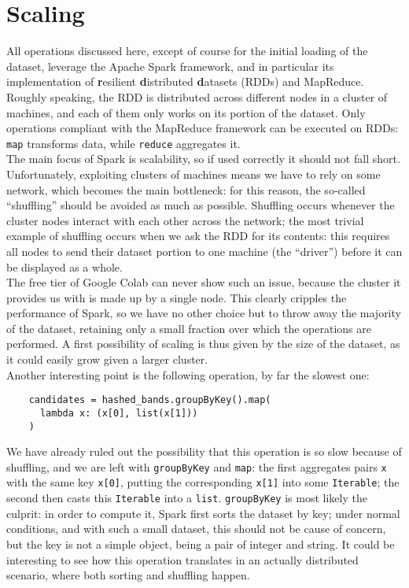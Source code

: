\documentclass{article}
\begin{document}
  \newpage

  \section{Scaling}
  All operations discussed here, except of course for the initial loading of
  the dataset, leverage the Apache Spark framework, and in particular its
  implementation of \textbf resilient \textbf distributed \textbf datasets
  (RDDs) and MapReduce. \\
  Roughly speaking, the RDD is distributed across different nodes in a cluster
  of machines, and each of them only works on its portion of the dataset. Only
  operations compliant with the MapReduce framework can be executed on RDDs:
  \texttt{map} transforms data, while \texttt{reduce} aggregates it. \\
  The main focus of Spark is scalability, so if used correctly it should not
  fall short. Unfortunately, exploiting clusters of machines means we have to
  rely on some network, which becomes the main bottleneck: for this reason, the
  so-called “shuffling” should be avoided as much as possible. Shuffling occurs
  whenever the cluster nodes interact with each other across the network; the
  most trivial example of shuffling occurs when we ask the RDD for its
  contents: this requires all nodes to send their dataset portion to one
  machine (the “driver”) before it can be displayed as a whole. \\
  The free tier of Google Colab can never show such an issue, because the
  cluster it provides us with is made up by a single node. This clearly
  cripples the performance of Spark, so we have no other choice but to throw
  away the majority of the dataset, retaining only a small fraction over which
  the operations are performed. A first possibility of scaling is thus given by
  the size of the dataset, as it could easily grow given a larger cluster. \\
  Another interesting point is the following operation, by far the slowest one:
  \begin{verbatim}
    candidates = hashed_bands.groupByKey().map(
      lambda x: (x[0], list(x[1]))
    )
  \end{verbatim}
  We have already ruled out the possibility that this operation is so slow
  because of shuffling, and we are left with \texttt{groupByKey} and
  \texttt{map}: the first aggregates pairs \texttt x with the same key
  \texttt{x[0]}, putting the corresponding \texttt{x[1]} into some
  \texttt{Iterable}; the second then casts this \texttt{Iterable} into a
  \texttt{list}. \texttt{groupByKey} is most likely the culprit: in order to
  compute it, Spark first sorts the dataset by key; under normal conditions,
  and with such a small dataset, this should not be cause of concern, but the
  key is not a simple object, being a pair of integer and string. It could be
  interesting to see how this operation translates in an actually distributed
  scenario, where both sorting and shuffling happen.
\end{document}
